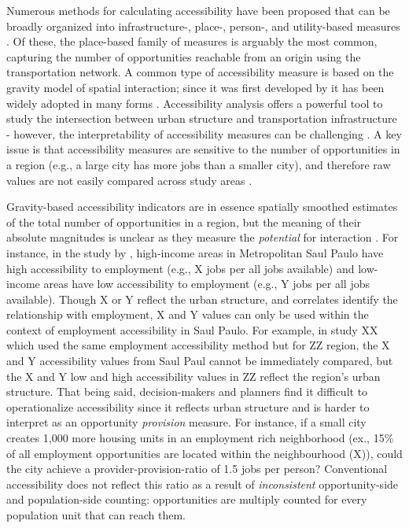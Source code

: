 \documentclass[]{elsarticle} %
\begin{document}
Numerous methods for calculating accessibility have been proposed that
can be broadly organized into infrastructure-, place-, person-, and
utility-based measures \citep{geurs2004}. Of these, the place-based
family of measures is arguably the most common, capturing the number of
opportunities reachable from an origin using the transportation network.
A common type of accessibility measure is based on the gravity model of
spatial interaction; since it was first developed by \citet{hansen1959}
it has been widely adopted in many forms
\citep[e.g.,][]{cervero_transportation_2002, paez2004network, geurs2004, handy_measuring_1997, levinson_accessibility_1998, Arranz2019measuring}.
Accessibility analysis offers a powerful tool to study the intersection
between urban structure and transportation infrastructure - however, the
interpretability of accessibility measures can be challenging
\citep{geurs2004, miller2018}. A key issue is that accessibility
measures are sensitive to the number of opportunities in a region (e.g.,
a large city has more jobs than a smaller city), and therefore raw
values are not easily compared across study areas \citep{allen2019}.

Gravity-based accessibility indicators are in essence spatially smoothed
estimates of the total number of opportunities in a region, but the
meaning of their absolute magnitudes is unclear as they measure the
\emph{potential} for interaction \citep[as originally defined
by][]{wilson1971}. For instance, in the study by
\citet{boisjoly2017informality}, high-income areas in Metropolitan Saul
Paulo have high accessibility to employment (e.g., X jobs per all jobs
available) and low-income areas have low accessibility to employment
(e.g., Y jobs per all jobs available). Though X or Y reflect the urban
structure, and correlates identify the relationship with employment, X
and Y values can only be used within the context of employment
accessibility in Saul Paulo. For example, in study XX which used the
same employment accessibility method but for ZZ region, the X and Y
accessibility values from Saul Paul cannot be immediately compared, but
the X and Y low and high accessibility values in ZZ reflect the region's
urban structure. That being said, decision-makers and planners find it
difficult to operationalize accessibility since it reflects urban
structure and is harder to interpret as an opportunity \emph{provision}
measure. For instance, if a small city creates 1,000 more housing units
in an employment rich neighborhood (ex., 15\% of all employment
opportunities are located within the neighbourhood (X)), could the city
achieve a provider-provision-ratio of 1.5 jobs per person? Conventional
accessibility does not reflect this ratio as a result of
\emph{inconsistent} opportunity-side and population-side counting:
opportunities are multiply counted for every population unit that can
reach them.
\end{document}
